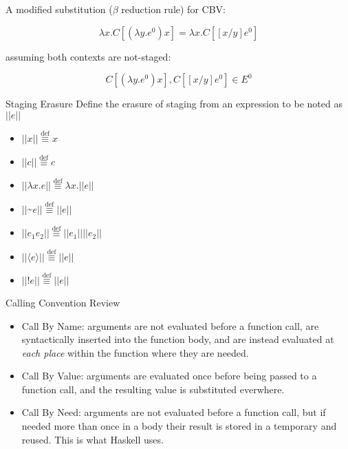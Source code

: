 \documentclass{beamer}
\newcommand{\defeq}{\overset{\text{def}}\equiv}
\begin{document}
\begin{frame}

A modified substitution ($\beta$ reduction rule) for CBV:

\begin{equation*}
\lambda x.C[(\lambda y.e^0) x] = \lambda x.C[[x/y]e^0]
\end{equation*}

assuming both contexts are not-staged:

\begin{equation*}
C[(\lambda y.e^0) x], C[[x/y]e^0]  \in E^0
\end{equation*}

\end{frame}


\begin{frame}{Staging Erasure}
Define the erasure of staging from an expression to be noted as $||e||$\\
\begin{itemize}
  \item $||x|| \defeq x$
  \item $||c|| \defeq c$
  \item $||\lambda x.e|| \defeq \lambda x.||e||$
  \item $||$\textasciitilde$e|| \defeq ||e||$
  \item $||e_1 e_2|| \defeq ||e_1|| ||e_2||$
  \item $||\langle e \rangle|| \defeq ||e||$
  \item $||!e|| \defeq ||e||$
\end{itemize}
\end{frame}

\begin{frame}{Calling Convention Review}
\begin{itemize}
  \item Call By Name: arguments are not evaluated before a function call, are syntactically inserted into the function body, and are instead evaluated at \textit{each place} within the function where they are needed.
  \item Call By Value: arguments are evaluated once before being passed to a function call, and the resulting value is substituted everwhere.
  \item Call By Need: arguments are not evaluated before a function call, but if needed more than once in a body their result is stored in a temporary and reused. This is what Haskell uses.
\end{itemize}
\end{frame}
\end{document}
